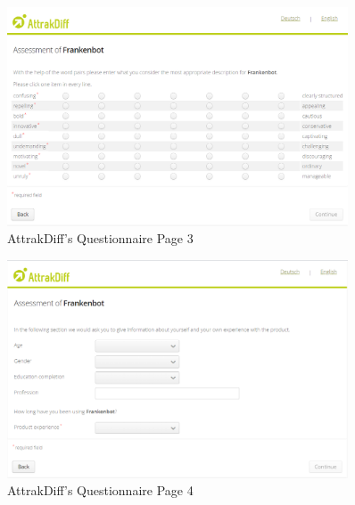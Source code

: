 \begin{appendix}
\begin{figure}[!h]
    \centering
    \includegraphics[width=0.9\textwidth]{img/AttrakDiff_Survey_3.PNG}
    \caption{AttrakDiff's Questionnaire Page 3 \cite{attrakdiff}}
    \label{fig:attr3}
\end{figure}

\begin{figure}[!h]
    \centering
    \includegraphics[width=0.9\textwidth]{img/AttrakDiff_Survey_4.PNG}
    \caption{AttrakDiff's Questionnaire Page 4 \cite{attrakdiff}}
    \label{fig:attr4}
\end{figure}




\end{appendix}

\endinput